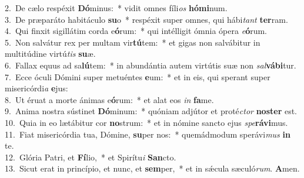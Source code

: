 {2.~}De cælo respéxit \textbf{Dó}minus:~* vidit omnes fíli\textit{os} \textbf{hó}\textbf{mi}num.\\
{3.~}De præparáto habitáculo \textbf{su}o~* respéxit super omnes, qui hábi\textit{tant} \textbf{ter}ram.\\
{4.~}Qui finxit sigillátim corda e\textbf{ó}rum:~* qui intélligit ómnia ópera \textit{e}\textbf{ó}rum.\\
{5.~}Non salvátur rex per multam vir\textbf{tú}tem:~* et gigas non salvábitur in multitúdine virtú\textit{tis} \textbf{su}æ.\\
{6.~}Fallax equus ad sa\textbf{lú}tem:~* in abundántia autem virtútis suæ non \textit{sal}\textbf{vá}\textbf{bi}tur.\\
{7.~}Ecce óculi Dómini super metuéntes \textbf{e}um:~* et in eis, qui sperant super misericórdi\textit{a} \textbf{e}jus:\\
{8.~}Ut éruat a morte ánimas e\textbf{ó}rum:~* et alat eos \textit{in} \textbf{fa}me.\\
{9.~}Anima nostra sústinet \textbf{Dó}minum:~* quóniam adjútor et proté\textit{ctor} \textbf{no}\textbf{ster} est.\\
{10.~}Quia in eo lætábitur cor \textbf{no}strum:~* et in nómine sancto ejus \textit{spe}\textbf{rá}\textbf{vi}mus.\\
{11.~}Fiat misericórdia tua, Dómine, \textbf{su}per nos:~* quemádmodum sperávi\textit{mus} \textbf{in} te.\\
{12.~}Glória Patri, et \textbf{Fí}lio,~* et Spirítu\textit{i} \textbf{San}cto.\\
{13.~}Sicut erat in princípio, et nunc, et \textbf{sem}per,~* et in sǽcula sæculó\textit{rum}. \textbf{A}men.\\

